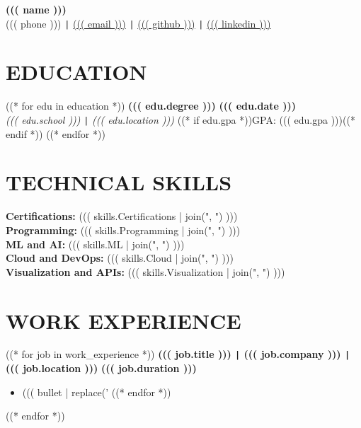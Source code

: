 \documentclass[10pt]{article}
\begin{document}
\begin{center}
    \textbf{\fontsize{18}{18}\selectfont ((( name )))} \\
    ((( phone ))) \texttt{|} \href{mailto:((( email )))}{((( email )))} \texttt{|}
    \href{((( github )))}{((( github )))} \texttt{|}  
    \href{((( linkedin )))}{((( linkedin )))}
\end{center}

\vspace{-0.7cm}
\section*{EDUCATION} 
\vspace{-0.2cm} 
((* for edu in education *))
\noindent 
\textbf{((( edu.degree )))} \hfill \textbf{((( edu.date )))} \\
\textit{((( edu.school )))} \texttt{|} \textit{((( edu.location )))} ((* if edu.gpa *))\hfill GPA: ((( edu.gpa )))((* endif *))
((* endfor *))

\vspace{-0.4cm} 
\section*{TECHNICAL SKILLS} 
\vspace{-0.2cm}
\noindent
\textbf{Certifications:} ((( skills.Certifications | join(", ") ))) \\
\textbf{Programming:} ((( skills.Programming | join(", ") ))) \\
\textbf{ML and AI:} ((( skills.ML | join(", ") ))) \\
\textbf{Cloud and DevOps:} ((( skills.Cloud | join(", ") ))) \\
\textbf{Visualization and APIs:} ((( skills.Visualization | join(", ") )))

\vspace{-0.4cm}
\section*{WORK EXPERIENCE}
((* for job in work_experience *))
\vspace{-0.2cm}
\noindent
\textbf{((( job.title ))) \texttt{|} ((( job.company ))) \texttt{|} ((( job.location )))} \hfill \textbf{((( job.duration )))} 
\vspace{-0.15cm}
\begin{itemize}[leftmargin=0.5cm, itemsep=0pt]
((* for bullet in job.bullets *))
    \item ((( bullet | replace('%
((* endfor *))
\end{itemize}
((* endfor *))
\end{document}
